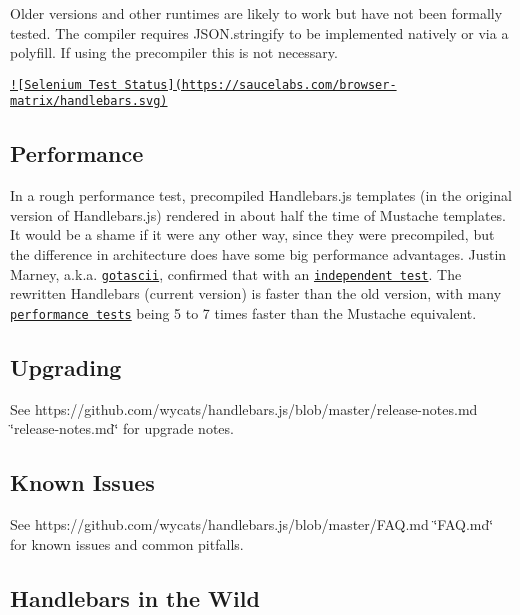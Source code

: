Older versions and other runtimes are likely to work but have not been formally tested. The compiler requires {\ttfamily J\+S\+O\+N.\+stringify} to be implemented natively or via a polyfill. If using the precompiler this is not necessary.

\href{https://saucelabs.com/u/handlebars}{\tt !\mbox{[}Selenium Test Status\mbox{]}(https\+://saucelabs.\+com/browser-\/matrix/handlebars.\+svg)}

\subsection*{Performance }

In a rough performance test, precompiled Handlebars.\+js templates (in the original version of Handlebars.\+js) rendered in about half the time of Mustache templates. It would be a shame if it were any other way, since they were precompiled, but the difference in architecture does have some big performance advantages. Justin Marney, a.\+k.\+a. \href{http://github.com/gotascii}{\tt gotascii}, confirmed that with an \href{http://sorescode.com/2010/09/12/benchmarks.html}{\tt independent test}. The rewritten Handlebars (current version) is faster than the old version, with many \href{https://travis-ci.org/wycats/handlebars.js/builds/33392182#L538}{\tt performance tests} being 5 to 7 times faster than the Mustache equivalent.

\subsection*{Upgrading }

See https\+://github.com/wycats/handlebars.\+js/blob/master/release-\/notes.md \char`\"{}release-\/notes.\+md\char`\"{} for upgrade notes.

\subsection*{Known Issues }

See https\+://github.com/wycats/handlebars.\+js/blob/master/\+F\+A\+Q.md \char`\"{}\+F\+A\+Q.\+md\char`\"{} for known issues and common pitfalls.

\subsection*{Handlebars in the Wild }


